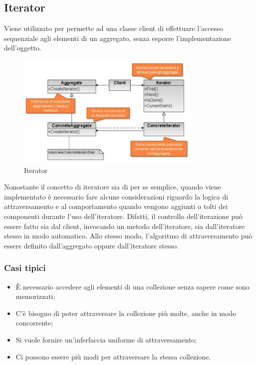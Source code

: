 \subsection{Iterator}
Viene utilizzato per permette ad una classe client di effettuare l'accesso sequenziale agli elementi di un aggregato, senza esporre l'implementazione dell'oggetto.

\begin{figure}[ht]
    \centering
    \includegraphics[width=0.8\textwidth]{immagini/iterator.png}
    \caption{Iterator}
\end{figure}
\FloatBarrier

Nonostante il concetto di iteratore sia di per se semplice, quando viene implementato è necessario fare alcune considerazioni riguardo la logica di attraversamento e al comportamento quando vengono aggiunti o tolti dei componenti durante l'uso dell'iteratore.
Difatti, il controllo dell'iterazione può essere fatto sia dal client, invocando un metodo dell'iteratore, sia dall'iteratore stesso in modo automatico. Allo stesso modo, l'algoritmo di attraversamento può essere definito dall'aggregato oppure dall'iteratore stesso.

\subsubsection{Casi tipici}
\begin{itemize}
\item \`{E} necessario accedere agli elementi di una collezione senza sapere come sono memorizzati;
\item C'è bisogno di poter attraversare la collezione più molte, anche in modo concorrente;
\item Si vuole fornire un'inferfaccia uniforme di attraversamento;
\item Ci possono essere più modi per attraversare la stessa collezione.
\end{itemize}